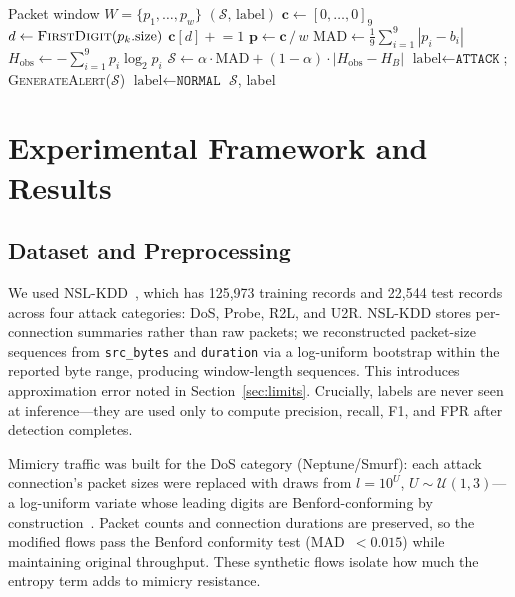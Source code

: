 \documentclass[conference]{IEEEtran}
\begin{document}
\begin{algorithm}[t]
\caption{Benford-Entropic NIDS Detection}
\label{alg:nids}
\small
\begin{algorithmic}[1]
\REQUIRE Packet window $W = \{p_1,\ldots,p_w\}$
\ENSURE $(\mathcal{S},\, \text{label})$
\STATE $\mathbf{c} \leftarrow [0,\ldots,0]_9$ 
  \STATE $d \leftarrow \textsc{FirstDigit}(p_k.\text{size})$
  \STATE $\mathbf{c}[d] \mathrel{+}= 1$
\ENDFOR
\STATE $\mathbf{p} \leftarrow \mathbf{c}\,/\,w$
\STATE $\text{MAD} \leftarrow \frac{1}{9}\sum_{i=1}^9|p_i - b_i|$
\STATE $H_{\mathrm{obs}} \leftarrow -\sum_{i=1}^9 p_i \log_2 p_i$
\STATE $\mathcal{S} \leftarrow \alpha\cdot\text{MAD} +
        (1-\alpha)\cdot|H_{\mathrm{obs}} - H_B|$
  \STATE $\text{label} \leftarrow \texttt{ATTACK}$;
         \textsc{GenerateAlert}($\mathcal{S}$)
\ELSE
  \STATE $\text{label} \leftarrow \texttt{NORMAL}$
\ENDIF
\RETURN $\mathcal{S}$, label
\end{algorithmic}
\end{algorithm}

\section{Experimental Framework and Results}

\subsection{Dataset and Preprocessing}

We used NSL-KDD~\cite{b9}, which has 125,973 training records and 22,544
test records across four attack categories: DoS, Probe, R2L, and U2R.
NSL-KDD stores per-connection summaries rather than raw packets; we
reconstructed packet-size sequences from \texttt{src\_bytes} and
\texttt{duration} via a log-uniform bootstrap within the reported byte
range, producing window-length sequences. This introduces approximation
error noted in Section~\ref{sec:limits}. Crucially, labels are never
seen at inference—they are used only to compute precision, recall, F1,
and FPR after detection completes.

Mimicry traffic was built for the DoS category (Neptune/Smurf): each
attack connection's packet sizes were replaced with draws from
$l = 10^U$, $U \sim \mathcal{U}(1, 3)$—a log-uniform variate whose
leading digits are Benford-conforming by construction~\cite{b5}. Packet
counts and connection durations are preserved, so the modified flows
pass the Benford conformity test (MAD~$< 0.015$) while maintaining
original throughput. These synthetic flows isolate how much the entropy
term adds to mimicry resistance.
\end{document}

